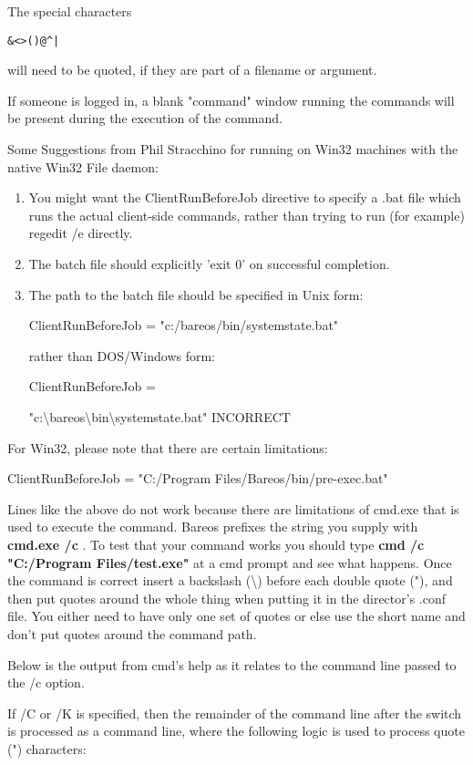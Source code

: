 \begin{description}
The special characters
\begin{verbatim}
&<>()@^|
\end{verbatim}
will need to be quoted,
if they are part of a filename or argument.

If someone is logged in, a blank "command" window running the commands
will be present during the execution of the command.

Some Suggestions from Phil Stracchino for running on Win32 machines with
the native Win32 File daemon:

\begin{enumerate}
\item You might want the ClientRunBeforeJob directive to specify a .bat
      file which runs the actual client-side commands, rather than trying
      to run (for example) regedit /e directly.
\item The batch file should explicitly 'exit 0' on successful completion.
\item The path to the batch file should be specified in Unix form:

ClientRunBeforeJob = "c:/bareos/bin/systemstate.bat"

rather than DOS/Windows form:

ClientRunBeforeJob =

"c:\textbackslash{}bareos\textbackslash{}bin\textbackslash{}systemstate.bat"
   INCORRECT
   \end{enumerate}

For Win32, please note that there are certain limitations:

ClientRunBeforeJob = "C:/Program Files/Bareos/bin/pre-exec.bat"

Lines like the above do not work because there are limitations of
cmd.exe that is used to execute the command.
Bareos prefixes the string you supply with {\bf cmd.exe /c }.  To test that
your command works you should type {\bf cmd /c "C:/Program Files/test.exe"} at a
cmd prompt and see what happens.  Once the command is correct insert a
backslash (\textbackslash{}) before each double quote ("), and
then put quotes around the whole thing when putting it in
the director's .conf file.  You either need to have only one set of quotes
or else use the short name and don't put quotes around the command path.

Below is the output from cmd's help as it relates to the command line
passed to the /c option.

If /C or /K is specified, then the remainder of the command line after
the switch is processed as a command line, where the following logic is
used to process quote (") characters:


\end{description}
